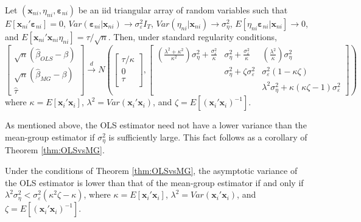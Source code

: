 \begin{thm}
\label{thm:OLSvsMG}
Let $\left( \mathbf{x}_{ni},\eta_{ni}, \boldsymbol{\varepsilon}_{ni} \right)$ be an iid triangular array of random variables such that $E[\mathbf{x}_{ni}'\boldsymbol{\varepsilon}_{ni}] =0$, $Var(\boldsymbol{\varepsilon}_{ni}|\mathbf{x}_{ni}) \rightarrow \sigma_{\varepsilon}^2 I_T$, $Var(\eta_{ni}|\mathbf{x}_{ni}) \rightarrow \sigma_{\eta}^2$, $E[\eta_{ni} \boldsymbol{\varepsilon}_{ni}|\mathbf{x}_{ni}] \rightarrow 0$, and $E[\mathbf{x}_{ni}'\mathbf{x}_{ni}\eta_{ni}] = \tau/\sqrt{n}$.
Then, under standard regularity conditions, 
\[
  \left[\begin{array}{c}
\sqrt{n} (\widehat{\beta}_{OLS} - \beta)\\
\sqrt{n} (\widehat{\beta}_{MG} - \beta)\\
\widehat{\tau}
\end{array}\right] \overset{d}{\rightarrow} N \left( 
\left[\begin{array}{c}
\tau/\kappa \\
0  \\
\tau\\
\end{array}\right],  
\left[
\begin{array}{ccc}
  \displaystyle\left(\frac{\lambda^2 + \kappa^2}{\kappa^2}\right)\sigma_\eta^2 + \frac{\sigma_\varepsilon^2}{\kappa} & \displaystyle \sigma_\eta^2 + \frac{\sigma_\varepsilon^2}{\kappa} &\displaystyle\left(\frac{\lambda^2}{\kappa}\right)\sigma_\eta^2  \\
  & \sigma_{\eta}^2 + \zeta \sigma_\varepsilon^2 & \sigma_{\varepsilon}^2 (1 - \kappa\zeta) \\
   &  & \lambda^2 \sigma_\eta^2 + \kappa(\kappa\zeta - 1) \sigma_\varepsilon^2 
\end{array}
\right]\right)
\]
where $\kappa = E[\mathbf{x}_i' \mathbf{x}_i]$, $\lambda^2 = Var\left( \mathbf{x}_i'\mathbf{x}_i \right)$, and $\zeta = E\left[ \left( \mathbf{x}_i' \mathbf{x}_i \right)^{-1} \right]$.  
\end{thm}

As mentioned above, the OLS estimator need not have a lower variance than the mean-group estimator if $\sigma_{\eta}^2$ is sufficiently large.
This fact follows as a corollary of Theorem \ref{thm:OLSvsMG}.

\begin{cor}
  Under the conditions of Theorem \ref{thm:OLSvsMG}, the asymptotic variance of the OLS estimator is lower than that of the mean-group estimator if and only if $\lambda^2\sigma_\eta^2 < \sigma_\varepsilon^2(\kappa^2\zeta - \kappa)$, 
where $\kappa = E[\mathbf{x}_i' \mathbf{x}_i]$, $\lambda^2 = Var\left( \mathbf{x}_i'\mathbf{x}_i \right)$, and $\zeta = E\left[ \left( \mathbf{x}_i' \mathbf{x}_i \right)^{-1} \right]$.  
\label{cor:MG}
\end{cor}

